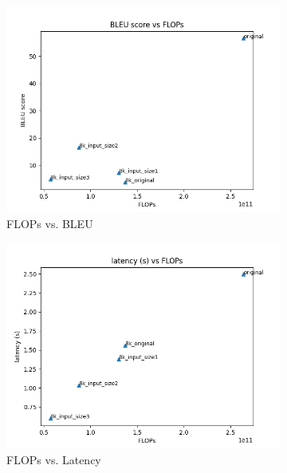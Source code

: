 \documentclass[11pt]{article}
\begin{document}
\begin{figure}[h]
    \centering
    \begin{subfigure}{0.32\textwidth}
        \includegraphics[width=\textwidth]{images/input_size_method2/BLEU_vs_FLOP.png}
        \caption{FLOPs vs. BLEU}
    \end{subfigure}
    \begin{subfigure}{0.32\textwidth}
        \includegraphics[width=\textwidth]{images/input_size_method2/latency_vs_FLOP.png}
        \caption{FLOPs vs. Latency}
    \end{subfigure}
    \begin{subfigure}{0.32\textwidth}

\end{subfigure}
\end{figure}
\end{document}
